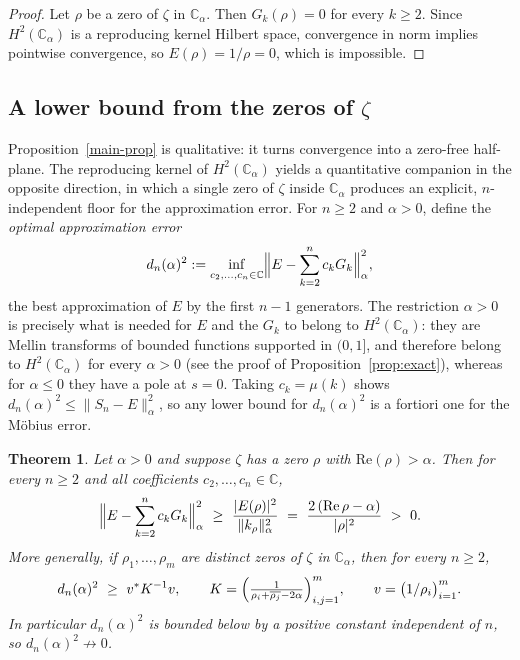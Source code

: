 \documentclass[11pt]{extarticle}
\numberwithin{equation}{section}
\theoremstyle{plain}
\newtheorem{theorem}{Theorem}[section]
\theoremstyle{remark}
\begin{document}
\begin{proof}
Let $\rho$ be a zero of $\zeta$ in $\mathbb{C}_\alpha$. Then $G_k(\rho) = 0$ 
for every $k \geq 2$. Since $H^2(\mathbb{C}_\alpha)$ is a reproducing kernel
Hilbert space, convergence in norm implies pointwise convergence, so
$E(\rho) = 1/\rho = 0$, which is impossible.
\end{proof}

\subsection{A lower bound from the zeros of $\zeta$}\label{subsec:lower}

Proposition~\ref{main-prop} is qualitative: it turns convergence into a zero-free
half-plane. The reproducing kernel of $H^2(\mathbb{C}_\alpha)$ yields a quantitative
companion in the opposite direction, in which a single zero of $\zeta$ inside
$\mathbb{C}_\alpha$ produces an explicit, $n$-independent floor for the
approximation error. For $n \geq 2$ and $\alpha > 0$, define the
\emph{optimal approximation error}
\[
d_n(\alpha)^2 := \inf_{c_2, \dots, c_n \in \mathbb{C}}
\Bigl\| E - \sum_{k=2}^{n} c_k G_k \Bigr\|^2_\alpha,
\]
the best approximation of $E$ by the first $n-1$ generators. The restriction
$\alpha > 0$ is precisely what is needed for $E$ and the $G_k$ to belong to
$H^2(\mathbb{C}_\alpha)$: they are Mellin transforms of bounded functions supported
in $(0,1]$, and therefore belong to $H^2(\mathbb{C}_\alpha)$ for every $\alpha > 0$
(see the proof of Proposition~\ref{prop:exact}), whereas for $\alpha \leq 0$ they have
a pole at $s = 0$. Taking
$c_k = \mu(k)$ shows $d_n(\alpha)^2 \leq \|S_n - E\|^2_\alpha$, so any lower bound
for $d_n(\alpha)^2$ is a fortiori one for the Möbius error.

\begin{theorem}\label{thm:lower}
Let $\alpha > 0$ and suppose $\zeta$ has a zero $\rho$ with
$\mathrm{Re}(\rho) > \alpha$. Then for every $n \geq 2$ and all coefficients
$c_2, \dots, c_n \in \mathbb{C}$,
\[
\Bigl\| E - \sum_{k=2}^{n} c_k G_k \Bigr\|^2_\alpha
\ \geq\ \frac{|E(\rho)|^2}{\|k_\rho\|^2_\alpha}
\ =\ \frac{2\,(\mathrm{Re}\,\rho - \alpha)}{|\rho|^2}\ >\ 0.
\]
More generally, if $\rho_1, \dots, \rho_m$ are distinct zeros of $\zeta$ in
$\mathbb{C}_\alpha$, then for every $n \geq 2$,
\[
d_n(\alpha)^2 \ \geq\ v^{*} K^{-1} v, \qquad
K = \Bigl( \tfrac{1}{\rho_i + \overline{\rho_j} - 2\alpha} \Bigr)_{i,j=1}^{m}, \qquad
v = \bigl( 1/\rho_i \bigr)_{i=1}^{m}.
\]
In particular $d_n(\alpha)^2$ is bounded below by a positive constant independent
of $n$, so $d_n(\alpha)^2 \not\to 0$.
\end{theorem}
\end{document}
